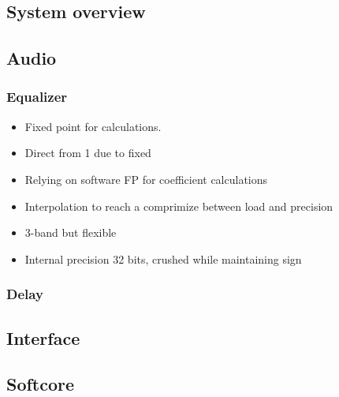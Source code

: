 \documentclass[12p]{article}
\begin{document}
{\subsection{System overview}
\label{Design:SystemOverview}

\subsection{Audio}
\label{Design:Audio}
\subsubsection{Equalizer}
\begin{itemize}
\item Fixed point for calculations.
\item Direct from 1 due to fixed
\item Relying on software FP for coefficient calculations
\item Interpolation to reach a comprimize between load and precision
\item 3-band but flexible
\item Internal precision 32 bits, crushed while maintaining sign
\end{itemize}
\subsubsection{Delay}

\subsection{Interface}
\label{Design:Interface}

\subsection{Softcore}
\label{Design:Softcore}




}
\end{document}
